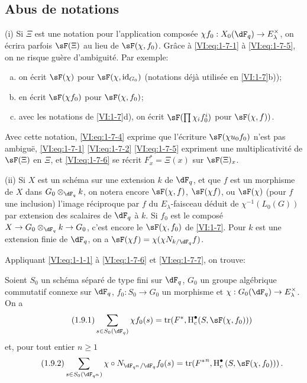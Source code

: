 \subsection{Abus de notations}\label{VI:1-8}

(i) Si $\Xi$ est une notation pour l'application compos\'ee 
$\chi f_0:X_0(\dF_q) \to E_\lambda^\times$, on \'ecrira parfois $\sF(\Xi)$ au 
lieu de $\sF(\chi,f_0)$. Grâce \`a \eqref{VI:eq:1-7-1} \`a \eqref{VI:eq:1-7-5}, 
on ne risque gu\`ere d'ambiguit\'e. Par exemple:
\begin{enumerate}[a)]
  \item on \'ecrit $\sF(\chi)$ pour $\sF(\chi,\operatorname{id}_{G_0})$ 
    (notations d\'ej\`a utilis\'ee en \ref{VI:1-7}b)); 
  \item en \'ecrit $\sF(\chi f_0)$ pour $\sF(\chi,f_0)$;
  \item avec les notations de \ref{VI:1-7}d), on \'ecrit 
    $\sF(\prod \chi_i f_0^i)$ pour $\sF(\chi,f))$. 
\end{enumerate}

Avec cette notation, \eqref{VI:eq:1-7-4} exprime que l'\'ecriture 
$\sF(\chi u_0 f_0)$ n'est pas ambiguë, \eqref{VI:eq:1-7-1} \eqref{VI:eq:1-7-2} 
\eqref{VI:eq:1-7-5} expriment une multiplicativit\'e de $\sF(\Xi)$ en $\Xi$, 
et \eqref{VI:eq:1-7-6} se r\'ecrit $F_x^\ast = \Xi(x)$ sur $\sF(\Xi)_x$.

(ii) Si $X$ est un sch\'ema sur une extension $k$ de $\dF_q$, et que $f$ est un 
morphisme de $X$ dans $G_0\otimes_{\dF_q} k$, on notera encore $\sF(\chi,f)$, 
$\sF(\chi f)$, ou $\sF(\chi)$ (pour $f$ une inclusion) l'image r\'eciproque par 
$f$ du $E_\lambda$-faisceau d\'eduit de $\chi^{-1}(L_0(G))$ par extension des 
scalaires de $\dF_q$ \`a $k$. Si $f_0$ est le compos\'e 
$X\to G_0\otimes_{\dF_q} k \to G_0$, c'est encore le $\sF(\chi,f_0)$ de 
\ref{VI:1-7}. Pour $k$ est une extension finie de $\dF_q$, on a 
$\sF(\chi f) = \chi(\chi N_{k/\dF_q} f)$. 

Appliquant \eqref{VI:eq:1-1-1} \`a \eqref{VI:eq:1-7-6} et \eqref{VI:eq:1-7-7}, 
on trouve: 





\begin{theorem_}\label{VI:1-9}
Soient $S_0$ un sch\'ema s\'epar\'e de type fini sur $\dF_q$, $G_0$ un groupe 
alg\'ebrique commutatif connexe sur $\dF_q$, $f_0:S_0\to G_0$ un morphisme et 
$\chi:G_0(\dF_q) \to E_\lambda^\times$. On a 
\begin{equation*}\tag{1.9.1}\label{VI:eq:1-9-1}
  \sum_{s\in S_0(\dF_q)} \chi f_0(s) = \tr(F^\ast,\h_c^\bullet(S,\sF(\chi,f_0))) 
\end{equation*}
et, pour tout entier $n\geqslant 1$
\begin{equation*}\tag{1.9.2}\label{VI:eq:1-9-2}
  \sum_{s\in S_0(\dF_{q^n})} \chi\circ N_{\dF_{q^n}/\dF_q} f_0(s) = \tr({F^\ast}^n, \h_c^\bullet\left(S,\sF(\chi,f_0))\right) \text{.}
\end{equation*}
\end{theorem_}





